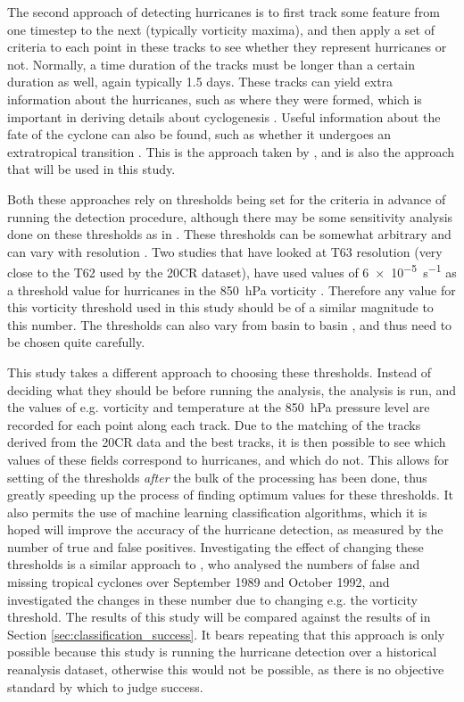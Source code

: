 \documentclass[pdftex,12pt,a4paper]{report}
\begin{document}
The second approach of detecting hurricanes is to first track some feature from one timestep to the
next (typically vorticity maxima), and then apply a set of criteria to each point in these tracks to
see whether they represent hurricanes or not. Normally, a time duration of the tracks must be longer
than a certain duration as well, again typically 1.5 days. These tracks can yield extra information
about the hurricanes, such as where they were formed, which is important in deriving details about
cyclogenesis \parencite{marchok2002ncep}. Useful information about the fate of the cyclone can also
be found, such as whether it undergoes an extratropical transition \parencite{hart2001climatology,
studholme2014objective}. This is the approach taken by \textcite{hodges1994general,
hodges1999adaptive, camargo2002improving}, and is also the approach that will be used in this study.

Both these approaches rely on thresholds being set for the criteria in advance of running the
detection procedure, although there may be some sensitivity analysis done on these thresholds as in
\textcite{walsh1997objective}. These thresholds can be somewhat arbitrary and can vary with resolution
\parencite{walsh2007objectively}. Two studies that have looked at T63 resolution (very close to the T62 used by
the 20CR dataset), have used values of \SI{6e-5}{s^{-1}} as a threshold value for hurricanes in the
\SI{850}{hPa} vorticity \parencite{bengtsson2006storm, bengtsson2007may}. Therefore any value for
this vorticity threshold used in this study should be of a similar magnitude to this number. The
thresholds can also vary from basin to basin \parencite{camargo2002improving}, and thus need to be
chosen quite carefully.

This study takes a different approach to choosing these thresholds. Instead of deciding what they
should be before running the analysis, the analysis is run, and the values of e.g. vorticity and
temperature at the \SI{850}{hPa} pressure level are recorded for each point along each track. Due to
the matching of the tracks derived from the 20CR data and the best tracks, it is then possible to
see which values of these fields correspond to hurricanes, and which do not. This allows for setting
of the thresholds \textit{after} the bulk of the processing has been done, thus greatly speeding up
the process of finding optimum values for these thresholds. It also permits the use of machine
learning classification algorithms, which it is hoped will improve the accuracy of the hurricane
detection, as measured by the number of true and false positives. Investigating the effect of
changing these thresholds is a similar approach to \textcite{walsh1997objective}, who analysed the
numbers of false and missing tropical cyclones over September 1989 and October 1992, and
investigated the changes in these number due to changing e.g. the vorticity threshold. The results
of this study will be compared against the results of \textcite{walsh1997objective} in Section
\ref{sec:classification_success}. It bears repeating that this approach is only possible because
this study is running the hurricane detection over a historical reanalysis dataset, otherwise this
would not be possible, as there is no objective standard by which to judge success.
\end{document}

